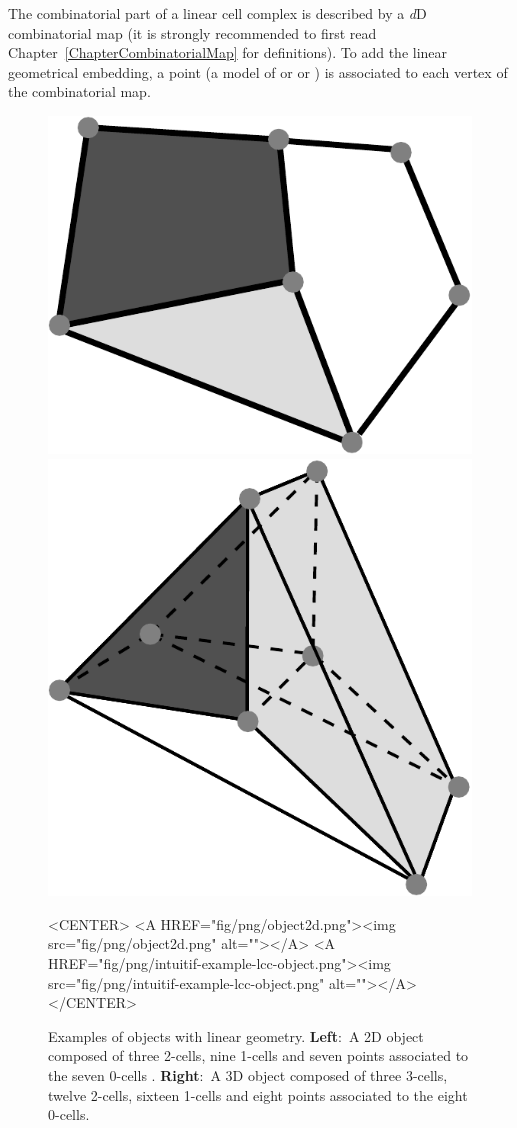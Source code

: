 The combinatorial part of a linear cell complex is described by a
\emph{d}D combinatorial map (it is strongly recommended to first
read Chapter~\ref{ChapterCombinatorialMap} for definitions).  To add
the linear geometrical embedding, a point (a model of
 or  or ) is
associated to each vertex of the combinatorial map.

\begin{figure}[ht]
  \begin{ccTexOnly}
    \begin{center}
      \includegraphics[width=.35\textwidth]
      {Linear_cell_complex/fig/pdf/object2d}
      \qquad
      \includegraphics[width=.45\textwidth]
      {Linear_cell_complex/fig/pdf/intuitif-example-lcc-object}
    \end{center}
  \end{ccTexOnly}
  \begin{ccHtmlOnly}
    <CENTER>
    <A HREF="fig/png/object2d.png"><img src="fig/png/object2d.png" alt=""></A>
    <A HREF="fig/png/intuitif-example-lcc-object.png"><img src="fig/png/intuitif-example-lcc-object.png" alt=""></A>
    </CENTER>
    \end{ccHtmlOnly}
    \caption{Examples of objects with linear geometry. \textbf{Left}:~A
      2D object composed of three 2-cells, nine
      1-cells and seven points associated to the seven 0-cells .   
      \textbf{Right}:~A
      3D object composed of three 3-cells, twelve 2-cells, sixteen
      1-cells and eight points associated to the eight 0-cells.
      \label{fig-exemple-introductif}}
\end{figure}
